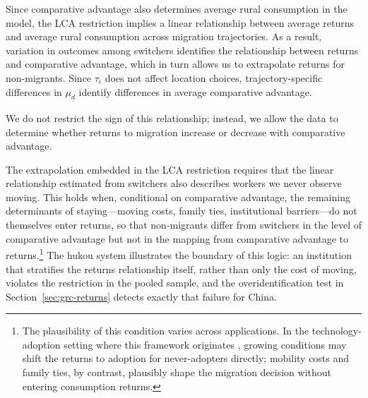\documentclass[12pt]{article}
\begin{document}
Since comparative advantage also determines average rural consumption in the model, the LCA restriction implies a linear relationship between average returns and average rural consumption across migration trajectories.
As a result, variation in outcomes among switchers identifies the relationship between returns and comparative advantage, which in turn allows us to extrapolate returns for non-migrants.
Since $\tau_i$ does not affect location choices, trajectory-specific differences in $\mu_{\underline{d}}$ identify differences in average comparative advantage.

We do not restrict the sign of this relationship; instead, we allow the data to determine whether returns to migration increase or decrease with comparative advantage.

The extrapolation embedded in the LCA restriction requires that the linear relationship estimated from switchers also describes workers we never observe moving.
This holds when, conditional on comparative advantage, the remaining determinants of staying---moving costs, family ties, institutional barriers---do not themselves enter returns, so that non-migrants differ from switchers in the level of comparative advantage but not in the mapping from comparative advantage to returns.\footnote{The plausibility of this condition varies across applications.
In the technology-adoption setting where this framework originates \citep{suriSelectionComparativeAdvantage2011}, growing conditions may shift the returns to adoption for never-adopters directly; mobility costs and family ties, by contrast, plausibly shape the migration decision without entering consumption returns.}
The hukou system illustrates the boundary of this logic: an institution that stratifies the returns relationship itself, rather than only the cost of moving, violates the restriction in the pooled sample, and the overidentification test in Section~\ref{sec:grc-returns} detects exactly that failure for China.
\end{document}
